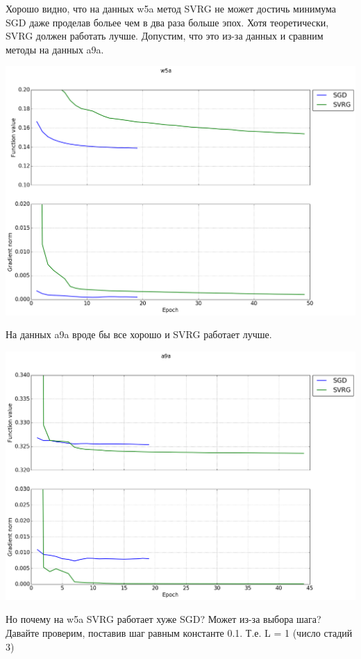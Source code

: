 \documentclass[12pt, a4paper]{article}
\begin{document}
    Хорошо видно, что на данных w5a метод SVRG не может достичь минимума SGD даже проделав больее чем в два раза больше эпох. Хотя теоретически, SVRG должен работать лучше.
    Допустим, что это из-за данных и сравним методы на данных a9a.

    \begin{center}\includegraphics[width=\picwidth]{cmp_w5a.png}\end{center}

    На данных a9a вроде бы все хорошо и SVRG работает лучше.

    \begin{center}\includegraphics[width=\picwidth]{cmp_a9a.png}\end{center}

    Но почему на w5a SVRG работает хуже SGD? Может из-за выбора шага? Давайте проверим, поставив шаг равным константе 0.1. Т.е. L = 1 (число стадий 3)
\end{document}
